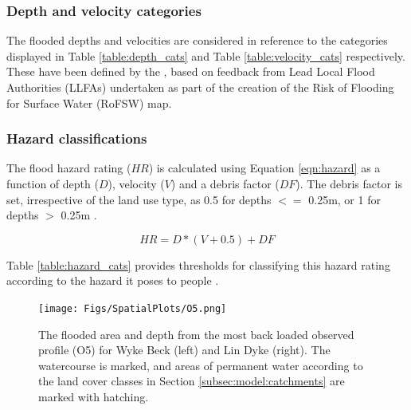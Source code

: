 \documentclass[APA,Times2COL]{WileyNJDv5}
\begin{document}
\subsubsection{Depth and velocity categories}\label{sec:sec:depth_cat}
The flooded depths and velocities are considered in reference to the categories displayed in Table \ref{table:depth_cats} and Table \ref{table:velocity_cats} respectively. These have been defined by the \citet{environment2019risk}, based on feedback from Lead Local Flood Authorities (LLFAs) undertaken as part of the creation of the Risk of Flooding for Surface Water (RoFSW) map. 

\subsubsection{Hazard classifications}\label{subsec:hazard}
The flood hazard rating ($HR$) is calculated using Equation \ref{eqn:hazard} as a function of depth ($D$), velocity ($V$) and a debris factor ($DF$). The debris factor is set, irrespective of the land use type, as 0.5 for depths $<=$ 0.25m, or 1 for depths $>$ 0.25m \citep{environment2019risk}.

\begin{equation}
HR = D * (V +0.5) + DF
  \label{eqn:hazard}
\end{equation}

Table \ref{table:hazard_cats} provides thresholds for classifying this hazard rating according to the hazard it poses to people \citep{surendran2008supplementary}.

\begin{figure}[h!]
    \centering
 \texttt{[image: Figs/SpatialPlots/O5.png]}   
   \caption{The flooded area and depth from the most back loaded observed profile (O5) for Wyke Beck (left) and Lin Dyke (right). The watercourse is marked, and areas of permanent water according to the land cover classes in Section \ref{subsec:model:catchments} are marked with hatching.}\label{fig:flooded_area_spatial_BL} 
\end{figure}
\end{document}
